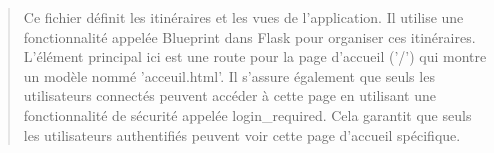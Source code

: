 \documentclass{article}
\begin{document}
\begin{quote}
\vspace*{1\baselineskip}

Ce fichier définit les itinéraires et les vues de l'application. 
Il utilise une fonctionnalité appelée Blueprint dans Flask pour organiser ces itinéraires.
L'élément principal ici est une route pour la page d'accueil ('/') qui montre un modèle nommé 'acceuil.html'. Il s'assure également que seuls les utilisateurs connectés peuvent accéder à cette page en utilisant une fonctionnalité de sécurité appelée login\_required. 
Cela garantit que seuls les utilisateurs authentifiés peuvent voir cette page d'accueil spécifique.
\end{quote}
\end{document}
